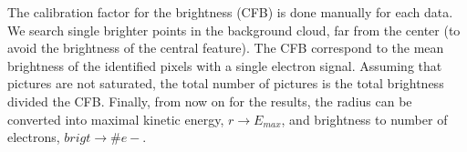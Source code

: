 The calibration factor for the brightness (CFB) is done manually for each data. We search single brighter points in the background cloud, far from the center (to avoid the brightness of the central feature). The CFB correspond to the mean brightness of the identified pixels with a single electron signal. Assuming that pictures are not saturated, the total number of pictures is the total brightness divided the CFB. Finally, from now on for the results, the radius can be converted into maximal kinetic energy, $r\rightarrow E_{max}$, and brightness to number of electrons, $brigt\rightarrow \#e-$. 



